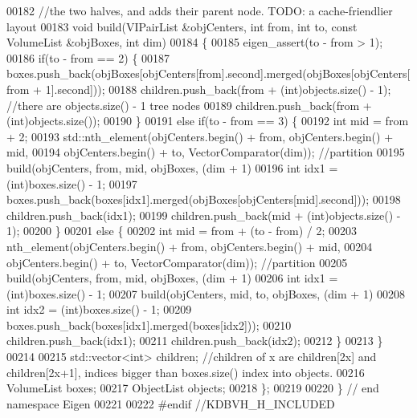 \begin{DoxyCode}
00182   \textcolor{comment}{//the two halves, and adds their parent node.  TODO: a cache-friendlier layout}
00183   \textcolor{keywordtype}{void} build(VIPairList &objCenters, \textcolor{keywordtype}{int} from, \textcolor{keywordtype}{int} to, \textcolor{keyword}{const} VolumeList &objBoxes, \textcolor{keywordtype}{int} dim)
00184   \{
00185     eigen\_assert(to - from > 1);
00186     \textcolor{keywordflow}{if}(to - from == 2) \{
00187       boxes.push\_back(objBoxes[objCenters[from].second].merged(objBoxes[objCenters[from + 1].second]));
00188       children.push\_back(from + (\textcolor{keywordtype}{int})objects.size() - 1); \textcolor{comment}{//there are objects.size() - 1 tree nodes}
00189       children.push\_back(from + (\textcolor{keywordtype}{int})objects.size());
00190     \}
00191     \textcolor{keywordflow}{else} \textcolor{keywordflow}{if}(to - from == 3) \{
00192       \textcolor{keywordtype}{int} mid = from + 2;
00193       std::nth\_element(objCenters.begin() + from, objCenters.begin() + mid,
00194                         objCenters.begin() + to, VectorComparator(dim)); \textcolor{comment}{//partition}
00195       build(objCenters, from, mid, objBoxes, (dim + 1) %
00196       \textcolor{keywordtype}{int} idx1 = (int)boxes.size() - 1;
00197       boxes.push\_back(boxes[idx1].merged(objBoxes[objCenters[mid].second]));
00198       children.push\_back(idx1);
00199       children.push\_back(mid + (\textcolor{keywordtype}{int})objects.size() - 1);
00200     \}
00201     \textcolor{keywordflow}{else} \{
00202       \textcolor{keywordtype}{int} mid = from + (to - from) / 2;
00203       nth\_element(objCenters.begin() + from, objCenters.begin() + mid,
00204                   objCenters.begin() + to, VectorComparator(dim)); \textcolor{comment}{//partition}
00205       build(objCenters, from, mid, objBoxes, (dim + 1) %
00206       \textcolor{keywordtype}{int} idx1 = (int)boxes.size() - 1;
00207       build(objCenters, mid, to, objBoxes, (dim + 1) %
00208       \textcolor{keywordtype}{int} idx2 = (int)boxes.size() - 1;
00209       boxes.push\_back(boxes[idx1].merged(boxes[idx2]));
00210       children.push\_back(idx1);
00211       children.push\_back(idx2);
00212     \}
00213   \}
00214 
00215   std::vector<int> children; \textcolor{comment}{//children of x are children[2x] and children[2x+1], indices bigger than
       boxes.size() index into objects.}
00216   VolumeList boxes;
00217   ObjectList objects;
00218 \};
00219 
00220 \} \textcolor{comment}{// end namespace Eigen}
00221 
00222 \textcolor{preprocessor}{#endif //KDBVH\_H\_INCLUDED}
\end{DoxyCode}
